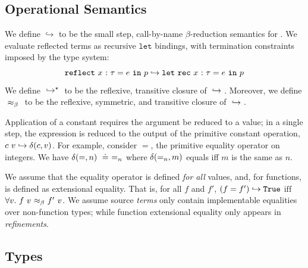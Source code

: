 \subsection{Operational Semantics}
We define $\hookrightarrow$ to be the small step, call-by-name
$\beta$-reduction semantics for \corelan.
%
We evaluate reflected terms %
as recursive $\mathtt{let}$ bindings, with termination
constraints imposed by the type system:
%
$$
{\mathtt{reflect}}\ {x} \ \text{:}\ {\tau} = e\ \mathtt{in}\ {p}
\hookrightarrow
{\ensuremath{\mathtt{let\ rec}}}\ {x} \ \text{:}\ {\tau} = e\ \mathtt{in}\ {p}
$$
%
We define ${}\hookrightarrow^{\star}{}$ to be the reflexive,
transitive closure of ${}\hookrightarrow{}$.
%
Moreover, we define ${}{\ \approx_{\beta}\ }{}$ to be the reflexive,
symmetric, and transitive closure of ${}\hookrightarrow{}$.

 Application of a constant requires the
argument be reduced to a value; in a single step, the
expression is reduced to the output of the primitive
constant operation, \ie ${c\ v} \hookrightarrow \delta(c, v)$.
%
For example, consider $=$, the primitive equality
operator on integers.
%
We have $\delta(=, n) \ \doteq\  =_n$
where $\delta(=_n, m)$ equals \etrue
iff $m$ is the same as $n$.
%
%

We assume that the equality operator
is defined \emph{for all} values,
and, for functions, is defined as
extensional equality.
%
%
That is, for all
$f$ and $f'$,
${(f = f')}\hookrightarrow{\ensuremath{\texttt{True}}}$
   $\mbox{iff}$
  $\forall v.\ {f\ v}{\ \approx_{\beta}\ }{f'\ v}$.
%
We assume source \emph{terms} only contain implementable equalities
over non-function types; while function extensional equality only
appears in \emph{refinements}. %

\subsection{Types}

